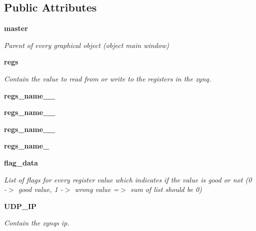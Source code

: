 \subsection*{Public Attributes}
\begin{DoxyCompactItemize}
\item 
\mbox{\label{classwatchman_1_1_watchman__main__window_a7db5be5bd31dd142b2ccfac4e45e1c02}} 
\textbf{ master}
\begin{DoxyCompactList}\small\item\em Parent of every graphical object (object main window) \end{DoxyCompactList}\item 
\mbox{\label{classwatchman_1_1_watchman__main__window_ad8d9b012eef926fac72654d3f5f09cca}} 
\textbf{ regs}
\begin{DoxyCompactList}\small\item\em Contain the value to read from or write to the registers in the zynq. \end{DoxyCompactList}\item 
\mbox{\label{classwatchman_1_1_watchman__main__window_a52d0d7d6fb44d07e9f87b1b631ef1f10}} 
{\bfseries regs\+\_\+name\+\_\+\_}
\item 
\mbox{\label{classwatchman_1_1_watchman__main__window_a96d18237f0a4a7873fe7e73064322bf8}} 
{\bfseries regs\+\_\+name\+\_\+\_}
\item 
\mbox{\label{classwatchman_1_1_watchman__main__window_a8e13043a85b58da41d0c25c1870c677b}} 
{\bfseries regs\+\_\+name\+\_\+\_}
\item 
\mbox{\label{classwatchman_1_1_watchman__main__window_aa614929875f711d9ba1ec49e94560083}} 
{\bfseries regs\+\_\+name\+\_}
\item 
\mbox{\label{classwatchman_1_1_watchman__main__window_a32abbe4563a532b7a97cc288ce713612}} 
\textbf{ flag\+\_\+data}
\begin{DoxyCompactList}\small\item\em List of flags for every register value which indicates if the value is good or not (0 -\/$>$ good value, 1 -\/$>$ wrong value =$>$ sum of list should be 0) \end{DoxyCompactList}\item 
\mbox{\label{classwatchman_1_1_watchman__main__window_a3068fe73ce063fec03c7e9f21408baac}} 
\textbf{ U\+D\+P\+\_\+\+IP}
\begin{DoxyCompactList}\small\item\em Contain the zynq\textquotesingle{}s ip. \end{DoxyCompactList}\item 

\end{DoxyCompactItemize}
